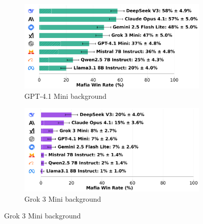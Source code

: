 \documentclass{article}
\begin{document}
\begin{figure}[htbp]
    \centering
    \begin{subfigure}[b]{0.48\textwidth}
        \centering
        \includegraphics[width=\textwidth]{../results/mafioso_gpt-4.1_mini_v4_1_benchmark.png}
        \caption{GPT-4.1 Mini background}
        \label{fig:mafioso_gpt41mini_appendix}
    \end{subfigure}
    \hfill
    \begin{subfigure}[b]{0.48\textwidth}
        \centering
        \includegraphics[width=\textwidth]{../results/mafioso_grok_3_mini_v4_1_benchmark.png}
        \caption{Grok 3 Mini background}
        \label{fig:mafioso_grok3_appendix}
    \end{subfigure}
    
    \vspace{0.5cm}
    

\end{figure}
\end{document}
